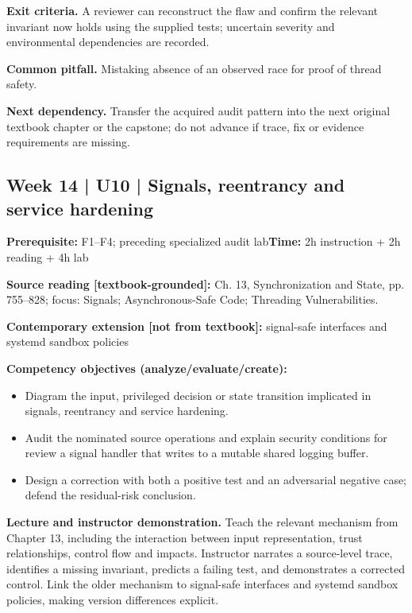 \documentclass[10pt,letterpaper]{article}
\begin{document}
\textbf{Exit criteria.} A reviewer can reconstruct the flaw and confirm the relevant invariant now holds using the supplied tests; uncertain severity and environmental dependencies are recorded.

\textbf{Common pitfall.} Mistaking absence of an observed race for proof of thread safety.

\textbf{Next dependency.} Transfer the acquired audit pattern into the next original textbook chapter or the capstone; do not advance if trace, fix or evidence requirements are missing.

\subsection{Week 14 | U10 | Signals, reentrancy and service hardening}
\textbf{Prerequisite:} F1--F4; preceding specialized audit lab\hfill\textbf{Time:} 2h instruction + 2h reading + 4h lab

\textbf{Source reading [textbook-grounded]:} Ch. 13, Synchronization and State, pp. 755--828; focus: Signals; Asynchronous-Safe Code; Threading Vulnerabilities.

\textbf{Contemporary extension [not from textbook]:} signal-safe interfaces and systemd sandbox policies

\textbf{Competency objectives (analyze/evaluate/create):}
\begin{itemize}[leftmargin=*,itemsep=2pt]
\item Diagram the input, privileged decision or state transition implicated in signals, reentrancy and service hardening.
\item Audit the nominated source operations and explain security conditions for review a signal handler that writes to a mutable shared logging buffer.
\item Design a correction with both a positive test and an adversarial negative case; defend the residual-risk conclusion.
\end{itemize}
\textbf{Lecture and instructor demonstration.} Teach the relevant mechanism from Chapter 13, including the interaction between input representation, trust relationships, control flow and impacts. Instructor narrates a source-level trace, identifies a missing invariant, predicts a failing test, and demonstrates a corrected control. Link the older mechanism to signal-safe interfaces and systemd sandbox policies, making version differences explicit.
\end{document}

